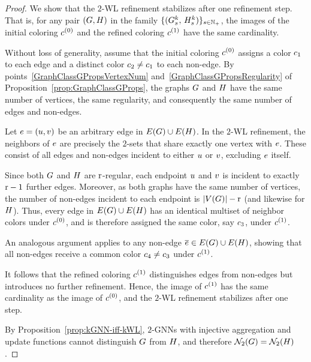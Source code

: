     
\begin{proof}
We show that the $2$-WL refinement stabilizes after one refinement step. That is, for any pair
$(G,H)$ in the family
$\{(G_s^k,\, H_s^k)\}_{s \in \mathbb{N}_+}$,
the images of the initial coloring $c^{(0)}$ and the refined coloring
$c^{(1)}$ have the same cardinality.

Without loss of generality, assume that the initial coloring $c^{(0)}$ assigns a color
$c_1$ to each edge and a distinct color $c_2 \neq c_1$ to each non-edge.
By points~\ref{GraphClassGPropsVertexNum} and~\ref{GraphClassGPropsRegularity} of
Proposition~\ref{prop:GraphClassGProps}, the graphs $G$ and $H$ have the same number
of vertices, the same regularity, and consequently the same number of edges and non-edges.

Let $e = (u,v)$ be an arbitrary edge in
$E(G) \cup E(H)$. In the $2$-WL refinement, the neighbors of $e$
are precisely the $2$-sets that share exactly one vertex with $e$. These consist of all edges
and non-edges incident to either $u$ or $v$, excluding $e$ itself.

Since both $G$ and $H$ are $\mathrm{r}$-regular, each endpoint $u$ and $v$
is incident to exactly $\mathrm{r} - 1$ further edges. Moreover, as both graphs have the same number of
vertices, the number of non-edges incident to each endpoint is
$|V(G)| - \mathrm{r}$ (and likewise for $H$).
Thus, every edge in $E(G) \cup E(H)$ has an identical multiset of
neighbor colors under $c^{(0)}$, and is therefore assigned the same color, say
$c_3$, under $c^{(1)}$.

An analogous argument applies to any non-edge
$\overline{e} \in E(G) \cup E(H)$, showing that all non-edges receive a
common color $c_4 \neq c_3$ under $c^{(1)}$.

It follows that the refined coloring $c^{(1)}$ distinguishes edges from non-edges but
introduces no further refinement. Hence, the image of $c^{(1)}$ has the same cardinality
as the image of $c^{(0)}$, and the $2$-WL refinement stabilizes after one step.

By Proposition~\ref{prop:kGNN-iff-kWL}, $2$-GNNs with injective aggregation and update functions
cannot distinguish $G$ from $H$, and therefore
$\mathcal{N}_2(G) = \mathcal{N}_2(H)$.
\end{proof}
